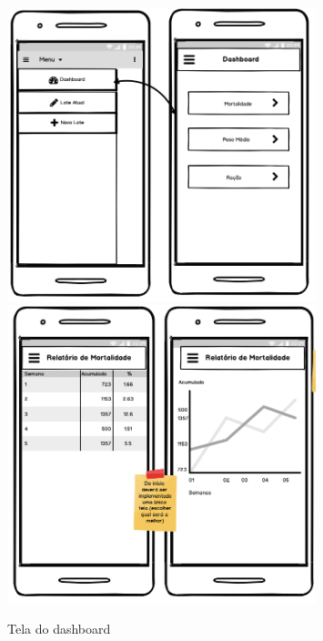\begin{apendicesenv}
\begin{figure}[htb!]
    \centering
    \caption{Tela do dashboard}
    \includegraphics[width=0.8\textwidth]{./dados/figuras/p6.png}
    \includegraphics[width=0.8\textwidth]{./dados/figuras/p7.png}
    \label{fig:p6}
\end{figure}




\end{apendicesenv}
